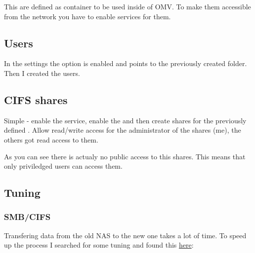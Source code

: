 
This  are defined as container to be used inside
of \gls{OMV}. To make them accessible from the network you have to enable
services for them.

\subsection{Users}

In the settings the option  is enabled and
points to the previously created  folder. Then I created
the users.


\subsection{CIFS shares}

Simple - enable the  service, enable the  and then create shares for the previously defined . Allow read/write access for the administrator of the shares (me),
the others got read access to them.



As you can see there is actualy no public access to this shares. This means
that only priviledged users can access them.

\subsection{Tuning}

\subsubsection{SMB/CIFS}

Transfering data from the old \gls{NAS} to the new one takes a lot of time. To
speed up the process I searched for some tuning and found this
\href{https://techie-show.com/open-media-vault-smb-performance-quick-win/}{here}:

